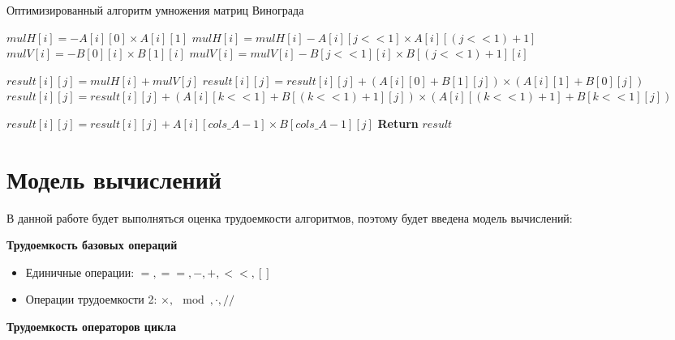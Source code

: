 \begin{algorithm}[H]
\caption{Оптимизированный алгоритм умножения матриц Винограда}
\label{alg:opt_vin_des}
\begin{algorithmic}
        \State $mulH[i] = -A[i][0] \times A[i][1]$
            \State $mulH[i] = mulH[i] - A[i][j << 1] \times A[i][(j << 1) + 1]$
        \EndFor
    \EndFor
        \State $mulV[i] = -B[0][i] \times B[1][i]$
            \State $mulV[i] = mulV[i] - B[j << 1][i] \times B[(j << 1) + 1][i]$
        \EndFor
    \EndFor
    
            \State $result[i][j] = mulH[i] + mulV[j]$
            \State $result[i][j] = result[i][j] + (A[i][0] + B[1][j]) \times (A[i][1] + B[0][j])$
                \State $result[i][j] = result[i][j] + (A[i][k << 1] + B[(k << 1) + 1][j]) \times (A[i][(k << 1) + 1] + B[k << 1][j])$
            \EndFor
        \EndFor
    \EndFor
    
                \State $result[i][j] = result[i][j] + A[i][cols\_A - 1] \times B[cols\_A - 1][j]$
            \EndFor
        \EndFor
    \EndIf
    \State \textbf{Return} $result$
\end{algorithmic}
\end{algorithm}

\section{Модель вычислений}

В данной работе будет выполняться оценка трудоемкости алгоритмов, поэтому будет введена модель вычислений:

\textbf{Трудоемкость базовых операций}

\begin{itemize}
    \item Единичные операции: $=, ==, -, +, <<, []$
    \item Операции трудоемкости 2: $\times, \mod, \cdot, //$
\end{itemize}

\textbf{Трудоемкость операторов цикла}

